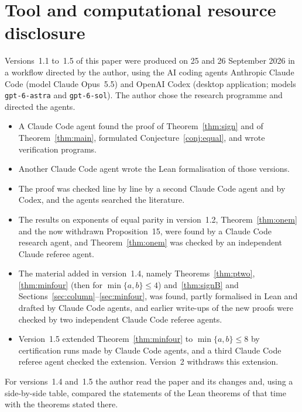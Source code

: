 \documentclass[11pt]{article}
\theoremstyle{remark}
\begin{document}
\section*{Tool and computational resource disclosure}
Versions~1.1 to~1.5 of this paper were produced on 25 and 26 September 2026 in a
workflow directed by the author, using the AI coding agents Anthropic Claude Code
(model Claude Opus~5.5) and OpenAI Codex (desktop application; models
\texttt{gpt-6-astra} and \texttt{gpt-6-sol}). The author chose the research
programme and directed the agents.
\begin{itemize}
\item A Claude Code agent found the proof of Theorem~\ref{thm:sign} and of
 Theorem~\ref{thm:main}, formulated Conjecture~\ref{conj:equal}, and wrote
 verification programs.
\item Another Claude Code agent wrote the Lean formalisation of those versions.
\item The proof was checked line by line by a second Claude Code agent and by
 Codex, and the agents searched the literature.
\item The results on exponents of equal parity in version~1.2,
 Theorem~\ref{thm:onem} and the now withdrawn Proposition~15, were found by a
 Claude Code research agent, and Theorem~\ref{thm:onem} was checked by an
 independent Claude referee agent.
\item The material added in version~1.4, namely Theorems~\ref{thm:ptwo},
 \ref{thm:minfour} (then for $\min\{a,b\}\le4$) and~\ref{thm:signB} and
 Sections~\ref{sec:column}--\ref{sec:minfour}, was found, partly formalised in Lean
 and drafted by Claude Code agents, and earlier write-ups of the new proofs were
 checked by two independent Claude Code referee agents.
\item Version~1.5 extended Theorem~\ref{thm:minfour} to $\min\{a,b\}\le8$ by
 certification runs made by Claude Code agents, and a third Claude Code referee agent
 checked the extension. Version~2 withdraws this extension.
\end{itemize}
For versions~1.4 and~1.5 the author read the paper and its changes and, using a
side-by-side table, compared the statements of the Lean theorems of that time with
the theorems stated there.
\end{document}
